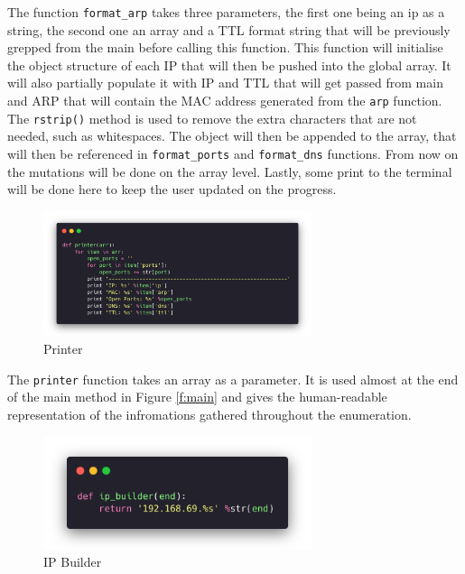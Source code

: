 The function \lstinline{format_arp} takes three parameters, the first one being
an ip as a string, the second one an array and a TTL format string that will be
previously grepped from the main before calling this function. This function
will initialise the object structure of each IP that will then be pushed into
the global array. It will also partially populate it with IP and TTL that will
get passed from main and ARP that will contain the MAC address generated from
the \lstinline{arp} function. The \lstinline{rstrip()} method is used to remove
the extra characters that are not needed, such as whitespaces. The object will
then be appended to the array, that will then be referenced in
\lstinline{format_ports} and \lstinline{format_dns} functions. From now on the
mutations will be done on the array level. Lastly, some print to the terminal
will be done here to keep the user updated on the progress.

\begin{figure}[H]
  \centering
  \includegraphics[width=0.7\textwidth]{figures/code/printer}
  \caption{Printer}
  \label{f:printer}
\end{figure}

The \lstinline{printer} function takes an array as a parameter. It is used
almost at the end of the main method in Figure \ref{f:main} and gives the
human-readable representation of the infromations gathered throughout the
enumeration.

\begin{figure}[H]
  \centering
  \includegraphics[width=0.7\textwidth]{figures/code/ip-builder}
  \caption{IP Builder}
  \label{f:ip-builder}
\end{figure}

